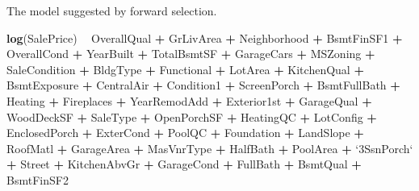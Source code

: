 \documentclass[american,]{article}
\newenvironment{Shaded}{\begin{snugshade}}{\end{snugshade}}
\newcommand{\DataTypeTok}[1]{\textcolor[rgb]{0.13,0.29,0.53}{#1}}
\newcommand{\KeywordTok}[1]{\textcolor[rgb]{0.13,0.29,0.53}{\textbf{#1}}}
\newcommand{\NormalTok}[1]{#1}
\newcommand{\OperatorTok}[1]{\textcolor[rgb]{0.81,0.36,0.00}{\textbf{#1}}}
\newcommand{\StringTok}[1]{\textcolor[rgb]{0.31,0.60,0.02}{#1}}
\begin{document}
The model suggested by forward selection.

\begin{Shaded}
\begin{Highlighting}[]
\KeywordTok{log}\NormalTok{(SalePrice) }\OperatorTok{~}\StringTok{ }
\StringTok{              }\NormalTok{OverallQual }\OperatorTok{+}\StringTok{ }\NormalTok{GrLivArea }\OperatorTok{+}\StringTok{ }\NormalTok{Neighborhood }\OperatorTok{+}\StringTok{ }\NormalTok{BsmtFinSF1 }\OperatorTok{+}
\StringTok{              }\NormalTok{OverallCond }\OperatorTok{+}\StringTok{ }\NormalTok{YearBuilt }\OperatorTok{+}\StringTok{ }\NormalTok{TotalBsmtSF }\OperatorTok{+}\StringTok{ }\NormalTok{GarageCars }\OperatorTok{+}\StringTok{ }\NormalTok{MSZoning }\OperatorTok{+}
\StringTok{              }\NormalTok{SaleCondition }\OperatorTok{+}\StringTok{ }\NormalTok{BldgType }\OperatorTok{+}\StringTok{ }\NormalTok{Functional }\OperatorTok{+}\StringTok{ }\NormalTok{LotArea }\OperatorTok{+}\StringTok{ }\NormalTok{KitchenQual }\OperatorTok{+}
\StringTok{              }\NormalTok{BsmtExposure }\OperatorTok{+}\StringTok{ }\NormalTok{CentralAir }\OperatorTok{+}\StringTok{ }\NormalTok{Condition1 }\OperatorTok{+}\StringTok{ }\NormalTok{ScreenPorch }\OperatorTok{+}\StringTok{ }\NormalTok{BsmtFullBath }\OperatorTok{+}
\StringTok{              }\NormalTok{Heating }\OperatorTok{+}\StringTok{ }\NormalTok{Fireplaces }\OperatorTok{+}\StringTok{ }\NormalTok{YearRemodAdd }\OperatorTok{+}\StringTok{ }\NormalTok{Exterior1st }\OperatorTok{+}\StringTok{ }\NormalTok{GarageQual }\OperatorTok{+}
\StringTok{              }\NormalTok{WoodDeckSF }\OperatorTok{+}\StringTok{ }\NormalTok{SaleType }\OperatorTok{+}\StringTok{ }\NormalTok{OpenPorchSF }\OperatorTok{+}\StringTok{ }\NormalTok{HeatingQC }\OperatorTok{+}\StringTok{ }\NormalTok{LotConfig }\OperatorTok{+}
\StringTok{              }\NormalTok{EnclosedPorch }\OperatorTok{+}\StringTok{ }\NormalTok{ExterCond }\OperatorTok{+}\StringTok{ }\NormalTok{PoolQC }\OperatorTok{+}\StringTok{ }\NormalTok{Foundation }\OperatorTok{+}\StringTok{ }\NormalTok{LandSlope }\OperatorTok{+}
\StringTok{              }\NormalTok{RoofMatl }\OperatorTok{+}\StringTok{ }\NormalTok{GarageArea }\OperatorTok{+}\StringTok{ }\NormalTok{MasVnrType }\OperatorTok{+}\StringTok{ }\NormalTok{HalfBath }\OperatorTok{+}\StringTok{ }\NormalTok{PoolArea }\OperatorTok{+}
\StringTok{              `}\DataTypeTok{3SsnPorch}\StringTok{`} \OperatorTok{+}\StringTok{ }\NormalTok{Street }\OperatorTok{+}\StringTok{ }\NormalTok{KitchenAbvGr }\OperatorTok{+}\StringTok{ }\NormalTok{GarageCond }\OperatorTok{+}\StringTok{ }\NormalTok{FullBath }\OperatorTok{+}
\StringTok{              }\NormalTok{BsmtQual }\OperatorTok{+}\StringTok{ }\NormalTok{BsmtFinSF2}
\end{Highlighting}
\end{Shaded}
\end{document}
